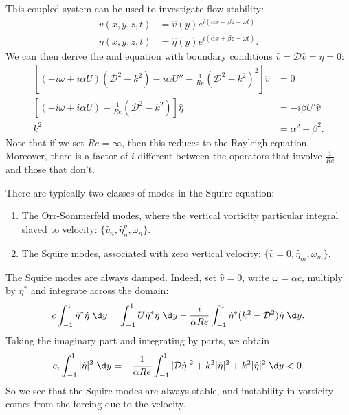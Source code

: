 \documentclass[a4paper]{article}
\begin{document}
This coupled system can be used to investigate flow stability:
\begin{align*}
  v(x, y, z, t) &= \hat{v}(y) e^{i(\alpha x + \beta z - \omega t)}\\
  \eta(x, y, z, t) &= \hat{\eta}(y) e^{i(\alpha x + \beta z - \omega t)}.
\end{align*}
We can then derive the  and  equation with boundary conditions $\hat{v} = \mathcal{D} \hat{v} = \eta = 0$:
\begin{align*}
  \left[(-i\omega + i \alpha U)(\mathcal{D}^2 - k^2) - i \alpha U'' - \frac{1}{Re} (\mathcal{D}^2 - k^2)^2\right] \hat{v} &= 0\\
  \left[(-i\omega + i \alpha U) - \frac{1}{Re} (\mathcal{D}^2 - k^2) \right] \hat{\eta} &= -i\beta U' \hat{v}\\
  k^2 &= \alpha^2 + \beta^2.
\end{align*}
Note that if we set $Re = \infty$, then this reduces to the Rayleigh equation. Moreover, there is a factor of $i$ different between the operators that involve $\frac{1}{Re}$ and those that don't.

There are typically two classes of modes in the Squire equation:
\begin{enumerate}
  \item The Orr-Sommerfeld modes, where the vertical vorticity particular integral slaved to velocity: $\{\hat{v}_n, \hat{\eta}_n^p, \omega_n\}$.
  \item The Squire modes, associated with zero vertical velocity: $\{\hat{v} = 0, \hat{\eta}_m, \omega_m\}$.
\end{enumerate}

The Squire modes are always damped. Indeed, set $\hat{v} = 0$, write $\omega = \alpha c$, multiply by $\eta^*$ and integrate across the domain:
\[
  c \int_{-1}^1 \hat{\eta}^* \hat{\eta} \;\d y = \int_{-1}^1 U \hat{\eta}^* \eta \;\d y - \frac{i}{\alpha Re} \int_{-1}^1 \hat{\eta}^* (k^2 - \mathcal{D}^2) \hat{\eta}\;\d y.
\]
Taking the imaginary part and integrating by parts, we obtain
\[
  c_i \int_{-1}^1 |\hat{\eta}|^2 \;\d y = - \frac{1}{\alpha Re} \int_{-1}^1 |\mathcal{D} \hat{\eta}|^2 + k^2 |\hat{\eta}|^2 + k^2 |\hat{\eta}|^2 \;\d y < 0.
\]
So we see that the Squire modes are always stable, and instability in vorticity comes from the forcing due to the velocity.
\end{document}
